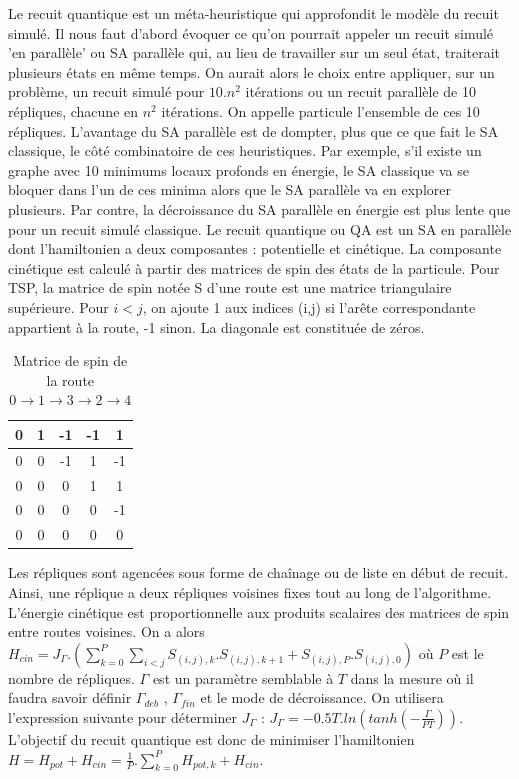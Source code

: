 \documentclass{article}%
\begin{document}
	Le recuit quantique est un méta-heuristique qui approfondit le modèle du recuit simulé. Il nous faut d'abord évoquer ce qu'on pourrait appeler un recuit simulé 'en parallèle' ou SA parallèle qui, au lieu de travailler sur un seul état, traiterait plusieurs états en même temps. On aurait alors le choix entre appliquer, sur un problème, un recuit simulé pour $ 10.n^2 $ itérations ou un recuit parallèle de 10 répliques, chacune en $ n^2 $ itérations. On appelle particule l'ensemble de ces 10 répliques. L'avantage du SA parallèle est de dompter, plus que ce que fait le SA classique, le côté combinatoire de ces heuristiques. Par exemple, s'il existe un graphe avec 10 minimums locaux profonds en énergie, le SA classique va se bloquer dans l'un de ces minima alors que le SA parallèle va en explorer plusieurs. Par contre, la décroissance du SA parallèle en énergie est plus lente que pour un recuit simulé classique.
	Le recuit quantique ou QA est un SA en parallèle dont l'hamiltonien a deux composantes : potentielle et cinétique. La composante cinétique est calculé à partir des matrices de spin des états de la particule. Pour TSP, la matrice de spin notée S d'une route est une matrice triangulaire supérieure. Pour $ i < j $, on ajoute 1 aux indices (i,j) si l'arête correspondante appartient à la route, -1 sinon. La diagonale est constituée de zéros. 
	
	\begin{table}[hp]
		\centering
			\begin{tabular}{|*{5}{c|}}
					\hline
					0  & 1  & -1 & -1 & 1 \\
					\hline
					0  & 0 & -1 & 1 & -1 \\
					\hline
					0  & 0 & 0 & 1 & 1 \\
					\hline
					0  & 0 & 0 & 0 & -1 \\
					\hline
					0  & 0 & 0 & 0 & 0 \\
					\hline
			\end{tabular}
		\label{spin}
		\caption{Matrice de spin de la route $ 0 \rightarrow 1 \rightarrow 3 \rightarrow 2 \rightarrow 4 $}
	\end{table}
	
	Les répliques sont agencées sous forme de chaînage ou de liste en début de recuit. Ainsi, une réplique a deux répliques voisines fixes tout au long de l'algorithme. L'énergie cinétique est proportionnelle aux produits scalaires des matrices de spin entre routes voisines. On a alors $ H_{cin} = J_{\Gamma}.(\sum_{k=0}^P \sum_{i<j} S_{(i,j),k}.S_{(i,j),k+1} + S_{(i,j),P}.S_{(i,j),0})$ où $ P $ est le nombre de répliques. $ \Gamma $ est un paramètre semblable à $ T $ dans la mesure où il faudra savoir définir $ \Gamma_{deb} $ , $ \Gamma_{fin} $ et le mode de décroissance. On utilisera l'expression suivante pour déterminer $ J_{\Gamma} $ : $ J_{\Gamma} = -0.5T.ln(tanh(-\frac{\Gamma}{PT})) $. 
		L'objectif du recuit quantique est donc de minimiser l'hamiltonien $ H = H_{pot} + H_{cin} = \frac{1}{P}.\sum_{k=0}^P H_{pot,k} + H_{cin} $.
		
\end{document}
